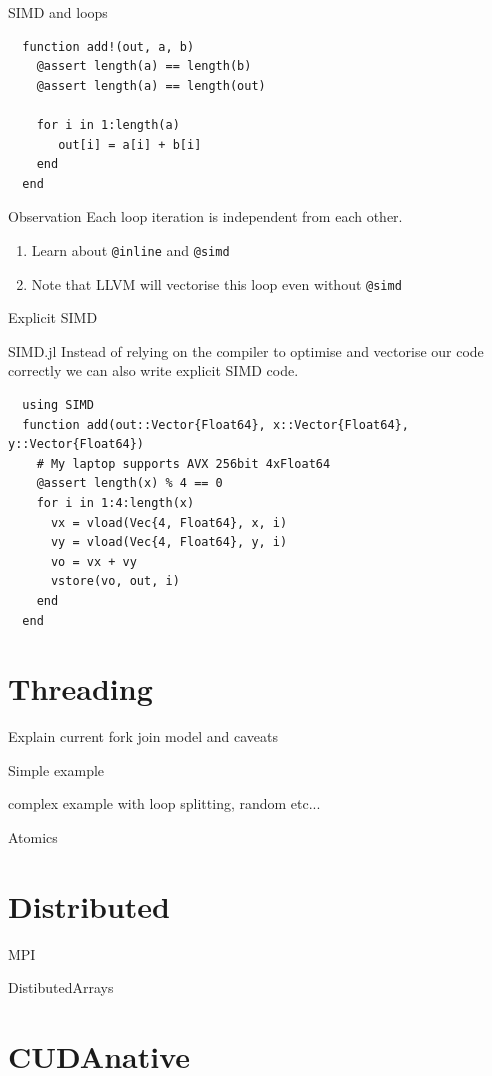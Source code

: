 \documentclass{beamer}
\begin{document}
\begin{frame}[fragile]{SIMD and loops}
  \begin{lstlisting}
  function add!(out, a, b)
    @assert length(a) == length(b)
    @assert length(a) == length(out)

    for i in 1:length(a)
       out[i] = a[i] + b[i]
    end
  end
  \end{lstlisting}
  \begin{block}{Observation}
    Each loop iteration is independent from each other.
  \end{block}
  \begin{enumerate}
    \item Learn about \lstinline{@inline} and \lstinline{@simd}
    \item Note that LLVM will vectorise this loop even without \lstinline{@simd}
  \end{enumerate}
\end{frame}
\begin{frame}[fragile]{Explicit SIMD}
  \begin{block}{SIMD.jl}
    Instead of relying on the compiler to optimise and vectorise our code correctly we can also write explicit SIMD code.
  \end{block}
  \begin{lstlisting}
  using SIMD
  function add(out::Vector{Float64}, x::Vector{Float64}, y::Vector{Float64})
    # My laptop supports AVX 256bit 4xFloat64
    @assert length(x) % 4 == 0
    for i in 1:4:length(x)
      vx = vload(Vec{4, Float64}, x, i)
      vy = vload(Vec{4, Float64}, y, i)
      vo = vx + vy
      vstore(vo, out, i)
    end
  end
  \end{lstlisting}
\end{frame}
\section{Threading}
\begin{frame}
  Explain current fork join model and caveats
\end{frame}
\begin{frame}
  Simple example
\end{frame}
\begin{frame}
  complex example with loop splitting, random etc...
\end{frame}
\begin{frame}
  Atomics
\end{frame}
\section{Distributed}
\begin{frame}
  MPI
\end{frame}
\begin{frame}
  DistibutedArrays
\end{frame}
\section{CUDAnative}
\end{document}
